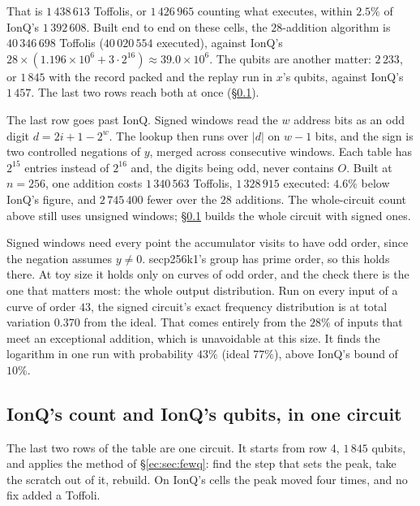 \documentclass[11pt]{article}
\theoremstyle{plain}
\theoremstyle{remark}
\begin{document}
That is $1\,438\,613$ Toffolis, or $1\,426\,965$ counting what executes, within $2.5\%$ of
IonQ's $1\,392\,608$. Built end to end on these cells, the $28$-addition algorithm is
$40\,346\,698$ Toffolis ($40\,020\,554$ executed), against IonQ's
$28\times(1.196\times10^6+3\cdot2^{16})\approx39.0\times10^6$. The qubits are another matter:
$2\,233$, or $1\,845$ with the record packed and the replay run in $x$'s qubits,
against IonQ's $1\,457$. The last two rows reach both at once (\S\ref{ec:sec:onecircuit}).

The last row goes past IonQ. Signed windows \cite{ec:hjnrs20,ec:kim26} read the $w$ address bits as
an odd digit $d=2i+1-2^w$. The lookup then runs over $|d|$ on $w-1$ bits, and the sign is two
controlled negations of $y$, merged across consecutive windows. Each table has $2^{15}$ entries
instead of $2^{16}$ and, the digits being odd, never contains $O$. Built at $n=256$, one addition
costs $1\,340\,563$ Toffolis, $1\,328\,915$ executed: $4.6\%$ below IonQ's
figure, and $2\,745\,400$ fewer over the $28$ additions. The whole-circuit count above still
uses unsigned windows; \S\ref{ec:sec:onecircuit} builds the whole circuit with signed ones.

Signed windows need every point the accumulator visits to have odd order, since the negation
assumes $y\neq0$. secp256k1's group has prime order, so this holds there. At toy size it holds only
on curves of odd order, and the check there is the one that matters most: the whole output
distribution. Run on every input of a curve of order $43$, the signed circuit's exact
frequency distribution is at total variation $0.370$ from the ideal. That comes entirely from
the $28\%$ of inputs that meet an exceptional addition, which is unavoidable at this size.
It finds the logarithm in one run with probability $43\%$ (ideal $77\%$), above
IonQ's bound of $10\%$.

\subsection{IonQ's count and IonQ's qubits, in one circuit}\label{ec:sec:onecircuit}

The last two rows of the table are one circuit. It starts from row 4, $1\,845$ qubits,
and applies the method of \S\ref{ec:sec:fewq}: find the step that sets the peak, take the scratch
out of it, rebuild. On IonQ's cells the peak moved four times, and no fix added a Toffoli.
\end{document}
